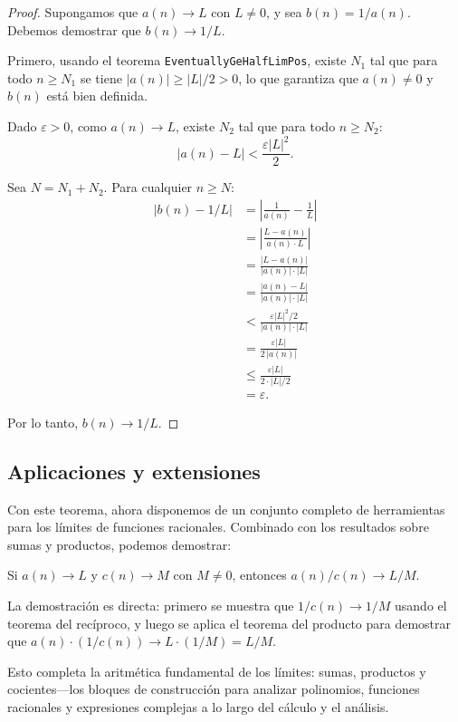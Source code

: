 \begin{proof}
Supongamos que $a(n) \to L$ con $L \neq 0$, y sea $b(n) = 1/a(n)$.
Debemos demostrar que $b(n) \to 1/L$.

Primero, usando el teorema \texttt{EventuallyGeHalfLimPos}, existe $N_1$
tal que para todo $n \geq N_1$ se tiene $|a(n)| \geq |L|/2 > 0$, lo
que garantiza que $a(n) \neq 0$ y $b(n)$ está bien definida.

Dado $\varepsilon > 0$, como $a(n) \to L$, existe $N_2$ tal que para
todo $n \geq N_2$:
\[
  |a(n) - L| < \frac{\varepsilon |L|^2}{2}.
\]

Sea $N = N_1 + N_2$. Para cualquier $n \geq N$:
\begin{align*}
  |b(n) - 1/L|
  &= \left|\frac{1}{a(n)} - \frac{1}{L}\right| \\
  &= \left|\frac{L - a(n)}{a(n) \cdot L}\right| \\
  &= \frac{|L - a(n)|}{|a(n)| \cdot |L|} \\
  &= \frac{|a(n) - L|}{|a(n)| \cdot |L|} \\
  &< \frac{\varepsilon |L|^2 / 2}{|a(n)| \cdot |L|} \\
  &= \frac{\varepsilon |L|}{2\,|a(n)|} \\
  &\leq \frac{\varepsilon |L|}{2 \cdot |L|/2} \\
  &= \varepsilon.
\end{align*}

Por lo tanto, $b(n) \to 1/L$.
\end{proof}

\subsection{Aplicaciones y extensiones}

Con este teorema, ahora disponemos de un conjunto completo de herramientas
para los límites de funciones racionales. Combinado con los resultados
sobre sumas y productos, podemos demostrar:

\begin{theorem}[Cociente]
Si $a(n) \to L$ y $c(n) \to M$ con $M \neq 0$, entonces
$a(n)/c(n) \to L/M$.
\end{theorem}

La demostración es directa: primero se muestra que $1/c(n) \to 1/M$
usando el teorema del recíproco, y luego se aplica el teorema del
producto para demostrar que $a(n) \cdot (1/c(n)) \to L \cdot (1/M) = L/M$.

Esto completa la aritmética fundamental de los límites: sumas, productos y
cocientes—los bloques de construcción para analizar polinomios, funciones
racionales y expresiones complejas a lo largo del cálculo y el análisis.

